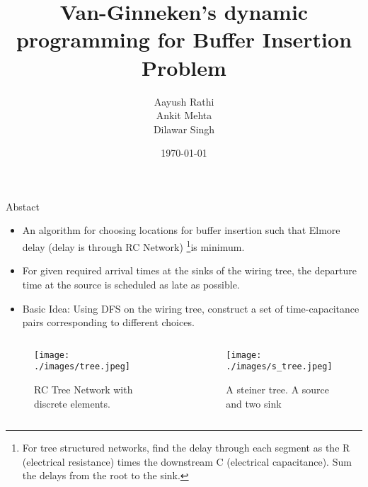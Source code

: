 \documentclass[10pt,sans,serif,trans]{beamer}
\title{Van-Ginneken's dynamic programming for Buffer Insertion Problem}
\institute[EE, IIT Bombay]{Department of Electrical Engineering \\  Indian
Institute of Technology Bombay}
\author{
Aayush Rathi \\
Ankit Mehta \\
Dilawar Singh}
\date{\today}
\begin{document}
\begin{frame}
   \maketitle
\end{frame}

\begin{frame}{Abstact}
   \begin{itemize}
      \item An algorithm for choosing locations for buffer insertion such that Elmore delay (delay
is through RC Network) \footnote{For tree structured networks, find the delay through each segment
as the R (electrical resistance) times the downstream C (electrical capacitance). Sum the delays
from the root to the sink.}is minimum.
\item For given required arrival times at the sinks of the wiring tree, the departure time at the
source is scheduled as late as possible.
\item Basic Idea: Using DFS on the wiring tree, construct a set of time-capacitance pairs
corresponding to different choices.
\end{itemize}

\begin{columns}[t]
\begin{column}[T]{5cm}
\begin{figure}[h]
\centering
\texttt{[image: ./images/tree.jpeg]} 
\caption{RC Tree Network with discrete elements.}
\end{figure}
\end{column}
\begin{column}[T]{5cm}
\begin{figure}[h]
\centering
\texttt{[image: ./images/s\_tree.jpeg]}
\caption{A steiner tree. A source and two sink}
\end{figure}
\end{column}
\end{columns}

\end{frame}
\end{document}
